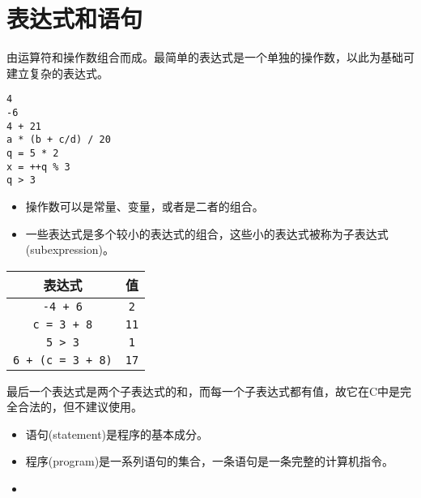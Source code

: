 \section{表达式和语句}

\begin{frame}[fragile]
\begin{defn}[]{}
  由运算符和操作数组合而成。最简单的表达式是一个单独的操作数，以此为基础可建立复杂的表达式。
\end{defn}
\begin{lstlisting}[backgroundcolor=\color{red!10}]
4
-6
4 + 21
a * (b + c/d) / 20
q = 5 * 2
x = ++q % 3
q > 3
\end{lstlisting}
\end{frame}

\begin{frame}[fragile]
\begin{itemize}
\item 操作数可以是常量、变量，或者是二者的组合。\\[0.15in]
\item 一些表达式是多个较小的表达式的组合，这些小的表达式被称为子表达式(subexpression)。
\end{itemize}
\end{frame}

\begin{frame}[fragile]

\begin{table}
\centering
\begin{tabular}{c|c} \hline
表达式 & 值 \\ \hline \hline
\lstinline|-4 + 6| & \lstinline|2|\\\hline
\lstinline|c = 3 + 8| & \lstinline|11| \\ \hline
\lstinline|5 > 3| & \lstinline|1| \\ \hline
\lstinline|6 + (c = 3 + 8)| & \lstinline|17| \\ \hline
\end{tabular}
\end{table}
最后一个表达式是两个子表达式的和，而每一个子表达式都有值，故它在C中是完全合法的，但不建议使用。

\end{frame}

\begin{frame}[fragile]
\begin{itemize}
\item 
  语句(statement)是程序的基本成分。\\[0.15in]
\item
  程序(program)是一系列语句的集合，一条语句是一条完整的计算机指令。\\[0.15in]
\item
{}
\end{itemize}

\end{frame}


